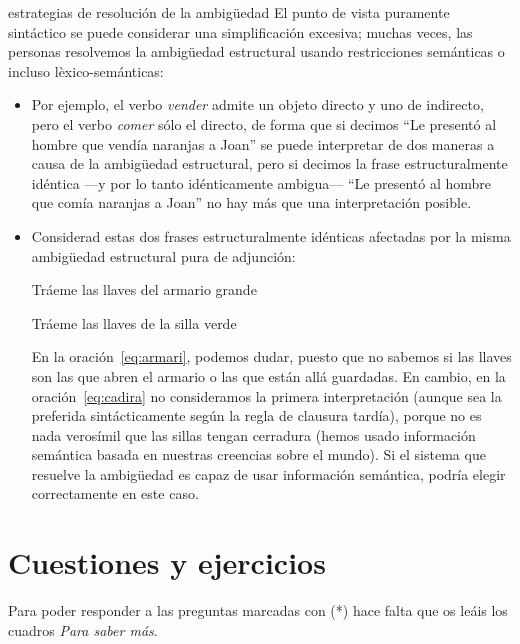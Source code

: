 \begin{persabermes}{estrategias de resolución de la ambigüedad}
El punto de vista puramente sintáctico se puede considerar una simplificación excesiva; muchas veces, las personas resolvemos la ambigüedad estructural usando restricciones semánticas o incluso lèxico-semánticas: \begin{itemize} \item Por ejemplo, el verbo \emph{vender} admite un objeto directo y uno de indirecto, pero el verbo \emph{comer} sólo el directo, de forma que si decimos ``Le presentó al hombre que vendía naranjas a Joan'' se puede interpretar de dos maneras a causa de la ambigüedad estructural, pero si decimos la frase estructuralmente idéntica ---y por lo tanto idénticamente ambigua--- ``Le presentó al hombre que comía naranjas a Joan'' no hay más que una interpretación posible. \item Considerad estas dos frases estructuralmente idénticas afectadas por la misma ambigüedad estructural pura de adjunción: \begin{exemple} \label{eq:armari} Tráeme las llaves del armario grande \end{exemple} \begin{exemple} \label{eq:cadira} Tráeme las llaves de la silla verde \end{exemple} En la oración~\ref{eq:armari}, podemos dudar, puesto que no sabemos si las llaves son las que abren el armario o las que están allá guardadas. En cambio, en la oración~\ref{eq:cadira} no consideramos la primera interpretación (aunque sea la preferida sintácticamente según la regla de clausura tardía), porque no es nada verosímil que las sillas tengan cerradura (hemos usado información semántica basada en nuestras creencias sobre el mundo). Si el sistema que resuelve la ambigüedad es capaz de usar información semántica, podría elegir correctamente en este caso. \end{itemize} \end{persabermes} 

\section{Cuestiones y ejercicios} Para poder responder a las preguntas marcadas con (*) hace falta que os leáis los cuadros \emph{Para saber más}. 

